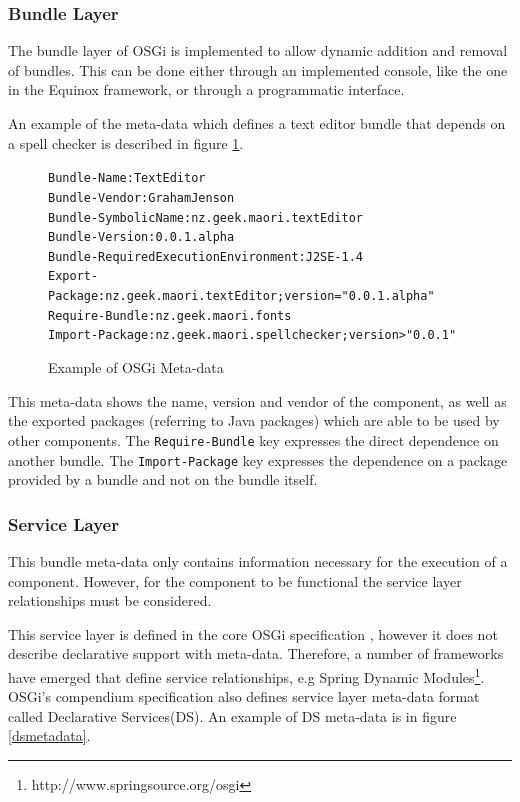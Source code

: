 \subsubsection{Bundle Layer}
The bundle layer of OSGi is implemented to allow dynamic addition and removal of bundles.
This can be done either through an implemented console, like the one in the Equinox framework, or through a programmatic interface.

An example of the meta-data which defines a text editor bundle that depends on a spell checker is described in figure \ref{osgibundle}.

\begin{figure}[htp]
\begin{center}
\begin{alltt}
Bundle-Name: TextEditor
Bundle-Vendor: Graham Jenson
Bundle-SymbolicName: nz.geek.maori.textEditor
Bundle-Version: 0.0.1.alpha
Bundle-RequiredExecutionEnvironment: J2SE-1.4
Export-Package: nz.geek.maori.textEditor;version="0.0.1.alpha"
Require-Bundle: nz.geek.maori.fonts
Import-Package: nz.geek.maori.spellchecker;version>"0.0.1"
\end{alltt}
  \caption[OSGi Meta-data]{Example of OSGi Meta-data}
  \label{osgibundle}
\end{center}
\end{figure}

This meta-data shows the name, version and vendor of the component, as well as the exported packages (referring to Java packages) which are able to be used by other components.
The \verb+Require-Bundle+ key expresses the direct dependence on another bundle.
The \verb+Import-Package+ key expresses the dependence on a package provided by a bundle and not on the bundle itself.

\subsubsection{Service Layer}
This bundle meta-data only contains information necessary for the execution of a component.
However, for the component to be functional the service layer relationships must be considered.

This service layer is defined in the core OSGi specification \citep{osgicore2007}, however it does not describe declarative support with meta-data.
Therefore, a number of frameworks have emerged that define service relationships, e.g
Spring Dynamic Modules\footnote{http://www.springsource.org/osgi}.
OSGi's compendium specification \citep{osgicompendium2007} also defines service layer meta-data format called Declarative Services(DS).
An example of DS meta-data is in figure \ref{dsmetadata}.

